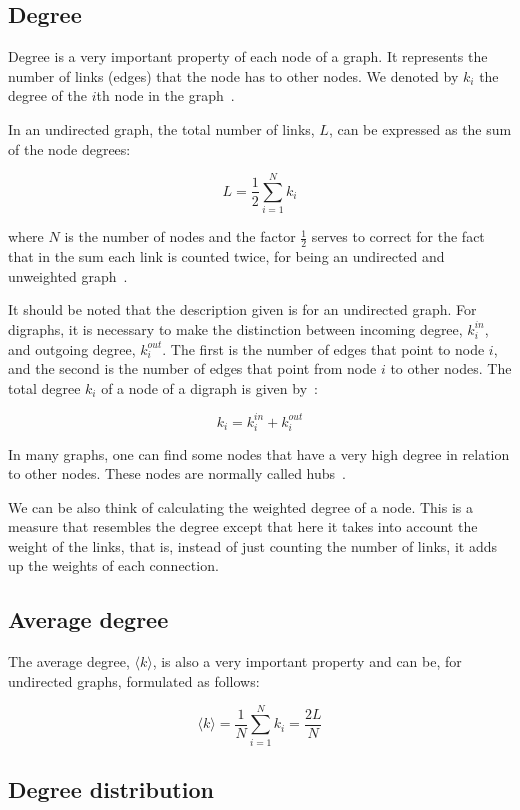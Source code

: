 \documentclass{article}
\begin{document}
\begin{multicols}{2}
\subsection{Degree}

Degree is a very important property of each node of a graph. It represents the number of links (edges) that the node has to other nodes. We denoted by $k_i$ the degree of the $i$th node in the graph~\cite{NS}.

In an undirected graph, the total number of links, $L$, can be expressed as the sum of the node degrees:

$$
L=\frac{1}{2}\sum\limits_{i=1}^{N}k_i
$$

where $N$ is the number of nodes and the factor $\frac{1}{2}$ serves to correct for the fact that in the sum each link is counted twice, for being an undirected and unweighted graph~\cite{NS}.

It should be noted that the description given is for an undirected graph. For digraphs, it is necessary to make the distinction between incoming degree, $k_i^{in}$, and outgoing degree, $k_i^{out}$. The first is the number of edges that point to node $i$, and the second is the number of edges that point from node $i$ to other nodes. The total degree $k_i$ of a node of a digraph is given by~\cite{NS}:

$$
k_i=k_i^{in}+k_i^{out}
$$

In many graphs, one can find some nodes that have a very high degree in relation to other nodes. These nodes are normally called hubs~\cite{networklit}.

We can be also think of calculating the weighted degree of a node. This is a measure that resembles the degree except that here it takes into account the weight of the links, that is, instead of just counting the number of links, it adds up the weights of each connection.


\subsection{Average degree}

The average degree, $\langle k \rangle$, is also a very important property and can be, for undirected graphs, formulated as follows:

$$
\langle k \rangle=\frac{1}{N}\sum\limits_{i=1}^{N}k_i=\frac{2L}{N}
$$


\subsection{Degree distribution}


\end{multicols}
\end{document}
